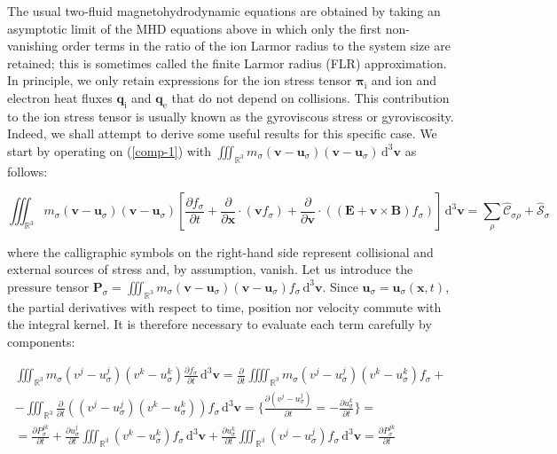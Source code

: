 \vspace*{2.5pt}

\quad The usual two-fluid magnetohydrodynamic equations are obtained by taking an asymptotic limit of the MHD equations above in which only the first non-vanishing order terms in the ratio of the ion Larmor radius to the system size are retained; this is sometimes called the finite Larmor radius (FLR) approximation. In principle, we only retain expressions for the ion stress tensor $\boldsymbol{\pi}_{\mathrm{i}}$ and ion and electron heat fluxes $\mathbf{q}_{\mathrm{i}}$ and $\mathbf{q}_{\mathrm{e}}$ that do not depend on collisions. This contribution to the ion stress tensor is usually known as the gyroviscous stress or gyroviscosity. Indeed, we shall attempt to derive some useful results for this specific case. We start by operating on (\ref{comp-1}) with $\iiint_{\mathbb{R}^3}m_{\sigma}\left(\mathbf{v}-\mathbf{u}_\sigma\right)\left(\mathbf{v}-\mathbf{u}_\sigma\right)\,\mathrm{d}^3 \mathbf{v}$ as follows:

\begin{equation*}
    \iiint_{\mathbb{R}^3}m_\sigma\left(\mathbf{v}-\mathbf{u}_\sigma\right)\left(\mathbf{v}-\mathbf{u}_\sigma\right)\left[\frac{\partial f_\sigma}{\partial t}+\frac{\partial}{\partial \mathbf{x}}\cdot\left(\mathbf{v}f_\sigma\right)+\frac{\partial}{\partial \mathbf{v}}\cdot\left(\left(\mathbf{E}+\mathbf{v}\times \mathbf{B}\right)f_\sigma\right)\right]\,\mathrm{d}^3 \mathbf{v}=\sum_{\rho}\hat{\mathcal{C}}_{\sigma\rho}+\hat{\mathcal{S}}_\sigma
\end{equation*}

where the calligraphic symbols on the right-hand side represent collisional and external sources of stress and, by assumption, vanish. Let us introduce the pressure tensor $\mathbf{P}_\sigma=\iiint_{\mathbb{R}^3}m_\sigma \left(\mathbf{v}-\mathbf{u}_\sigma\right)\left(\mathbf{v}-\mathbf{u}_\sigma\right)f_\sigma\,\mathrm{d^3}\mathbf{v}$. Since $\mathbf{u}_\sigma=\mathbf{u}_\sigma(\mathbf{x},t)$, the partial derivatives with respect to time, position nor velocity commute with the integral kernel. It is therefore necessary to evaluate each term carefully by components:

\begin{gather*}
    \iiint_{\mathbb{R}^3}m_\sigma \left(v^j-{u}_\sigma^j\right)\left({v}^k-{u}^k_\sigma\right)\frac{\partial f_\sigma}{\partial t}\,\mathrm{d^3}\mathbf{v}=\frac{\partial }{\partial t}\iiiint_{\mathbb{R}^3}m_\sigma\left(v^j-{u}^j_\sigma\right)\left({v}^k-{u}^k_\sigma\right)f_\sigma+\\
    -\iiint_{\mathbb{R}^3}\frac{\partial}{\partial t}\left(\left(v^j-u_\sigma^j\right)\left(v^k-u_\sigma^k\right)\right)f_\sigma\,\mathrm{d^3}\mathbf{v}=\bigg\{\frac{\partial \left(v^j-u_\sigma^j\right)}{\partial t}=-\frac{\partial u_\sigma^k}{\partial t}\bigg\}=\\
    =\frac{\partial P_\sigma^{jk}}{\partial t}+\frac{\partial u_\sigma^j}{\partial t}\iiint_{\mathbb{R}^3}\left(v^k-u_\sigma^k\right)f_\sigma\,\mathrm{d^3}\mathbf{v}+\frac{\partial u_\sigma^k}{\partial t}\iiint_{\mathbb{R}^3}\left(v^j-u_\sigma^j\right)f_\sigma\,\mathrm{d^3}\mathbf{v}=\frac{\partial P_\sigma^{jk}}{\partial t}
\end{gather*}

